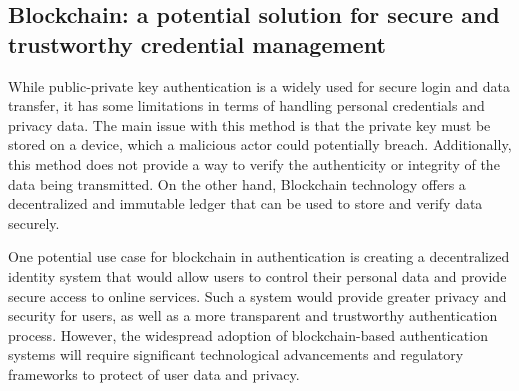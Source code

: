 \documentclass[target=mst,aauheader=]{thud}
\begin{document}
\subsection{Blockchain: a potential solution for secure and trustworthy credential management}

While public-private key authentication is a widely used for secure login and data transfer, it has some limitations in terms of handling personal credentials and privacy data. The main issue with this method is that the private key must be stored on a device, which a malicious actor could potentially breach. Additionally, this method does not provide a way to verify the authenticity or integrity of the data being transmitted. On the other hand, Blockchain technology offers a decentralized and immutable ledger that can be used to store and verify data securely.\par
One potential use case for blockchain in authentication is creating a decentralized identity system that would allow users to control their personal data and provide secure access to online services. Such a system would provide greater privacy and security for users, as well as a more transparent and trustworthy authentication process. However, the widespread adoption of blockchain-based authentication systems will require significant technological advancements and regulatory frameworks to protect of user data and privacy.\par
\end{document}
